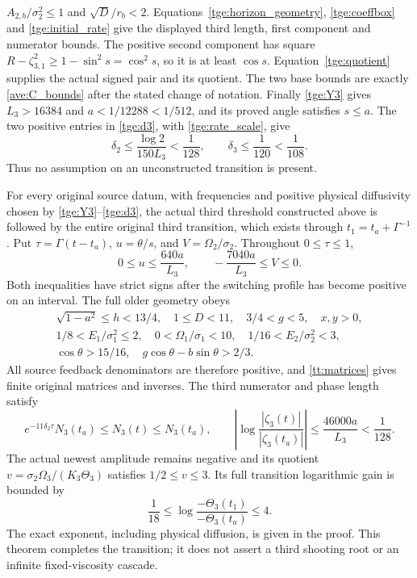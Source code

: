 $A_{2,b}/\sigma_2^2\leq1$ and $\sqrt D/r_b<2$.
Equations~\eqref{tge:horizon_geometry}, \eqref{tge:coeffbox} and
\eqref{tge:initial_rate} give the displayed third length, first
component and numerator bounds. The positive second component has
square $R-\zeta_{3,1}^2\geq1-\sin^2s=\cos^2s$, so it is at
least $\cos s$. Equation~\eqref{tge:quotient} supplies the actual
signed pair and its quotient. The two base bounds are exactly
\eqref{ave:C_bounds} after the stated change of notation.
Finally \eqref{tge:Y3} gives $L_3>16384$ and $a<1/12288<1/512$,
and its proved angle satisfies $s\leq a$. The two positive entries
in \eqref{tge:d3}, with \eqref{tge:rate_scale}, give
\[
 \delta_2\leq\frac{\log2}{150L_3}<\frac1{128},\qquad
 \delta_3\leq\frac1{120}<\frac1{108}.
\]
Thus no assumption on an unconstructed transition is present.

\begin{theorem}\label{tt:transition}
For every original source datum, with frequencies and positive physical
diffusivity chosen by \eqref{tge:Y3}--\eqref{tge:d3}, the actual third
threshold constructed above is followed by the entire original third
transition, which exists
through $t_1=t_a+\Gamma^{-1}$. Put
$\tau=\Gamma(t-t_a)$, $u=\theta/s$, and $V=\Omega_2/\sigma_2$.
Throughout $0\leq\tau\leq1$,
\begin{equation}\label{tt:revivalbounds}
 0\leq u\leq\frac{640a}{L_3},\qquad
 -\frac{7040a}{L_3}\leq V\leq0.
\end{equation}
Both inequalities have strict signs after the switching profile has
become positive on an interval. The full older geometry obeys
\begin{equation}\label{tt:olderbounds}
\begin{gathered}
 \sqrt{1-a^2}\leq h<13/4,\quad 1\leq D<11,\quad
 3/4<g<5,\quad x,y>0,\\
 1/8<E_1/\sigma_1^2\leq2,\quad
 0<\Omega_1/\sigma_1<10,\quad
 1/16<E_2/\sigma_2^2<3,\\
 \cos\theta>15/16,\quad
 g\cos\theta-b\sin\theta>2/3.
\end{gathered}
\end{equation}
All source feedback denominators are therefore positive, and
\eqref{tt:matrices} gives finite original matrices and inverses.
The third numerator and phase length satisfy
\begin{equation}\label{tt:coefficientvariation}
 e^{-11\delta_2\tau}N_3(t_a)\leq N_3(t)\leq N_3(t_a),
 \qquad
 \left|\log\frac{|\zeta_3(t)|}{|\zeta_3(t_a)|}\right|
       \leq\frac{46000a}{L_3}<\frac1{128}.
\end{equation}
The actual newest amplitude remains negative and its quotient
$v=\sigma_2\Omega_3/(K_3\Theta_3)$ satisfies $1/2\leq v\leq3$.
Its full transition logarithmic gain is bounded by
\begin{equation}\label{tt:gain}
 \frac1{18}\leq\log\frac{-\Theta_3(t_1)}{-\Theta_3(t_a)}\leq4.
\end{equation}
The exact exponent, including physical diffusion, is given in the proof.
This theorem completes the transition; it does not assert a third
shooting root or an infinite fixed-viscosity cascade.
\end{theorem}

